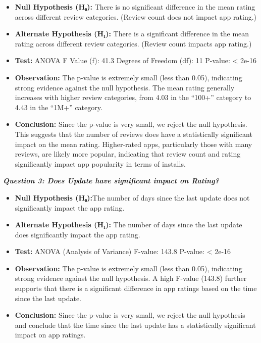 \documentclass[
]{article}
\begin{document}
\begin{itemize}
\item
  \textbf{Null Hypothesis (H₀):} There is no significant difference in
  the mean rating across different review categories. (Review count does
  not impact app rating.)
\item
  \textbf{Alternate Hypothesis (H₁):} There is a significant difference
  in the mean rating across different review categories. (Review count
  impacts app rating.)
\item
  \textbf{Test:} ANOVA F Value (f): 41.3 Degrees of Freedom (df): 11
  P-value: \textless{} 2e-16
\item
  \textbf{Observation:} The p-value is extremely small (less than 0.05),
  indicating strong evidence against the null hypothesis. The mean
  rating generally increases with higher review categories, from 4.03 in
  the ``100+'' category to 4.43 in the ``1M+'' category.
\item
  \textbf{Conclusion:} Since the p-value is very small, we reject the
  null hypothesis. This suggests that the number of reviews does have a
  statistically significant impact on the mean rating. Higher-rated
  apps, particularly those with many reviews, are likely more popular,
  indicating that review count and rating significantly impact app
  popularity in terms of installs.
\end{itemize}

\textbf{\emph{Question 3: Does Update have significant impact on
Rating?}}

\begin{itemize}
\item
  \textbf{Null Hypothesis (H₀):}The number of days since the last update
  does not significantly impact the app rating.
\item
  \textbf{Alternate Hypothesis (H₁):} The number of days since the last
  update does significantly impact the app rating.
\item
  \textbf{Test:} ANOVA (Analysis of Variance) F-value: 143.8 P-value:
  \textless{} 2e-16
\item
  \textbf{Observation:} The p-value is extremely small (less than 0.05),
  indicating strong evidence against the null hypothesis. A high F-value
  (143.8) further supports that there is a significant difference in app
  ratings based on the time since the last update.
\item
  \textbf{Conclusion:} Since the p-value is very small, we reject the
  null hypothesis and conclude that the time since the last update has a
  statistically significant impact on app ratings.
\end{itemize}
\end{document}
